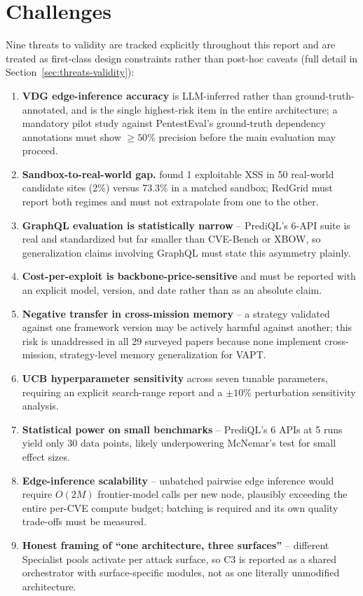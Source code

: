 \section{Challenges}
\label{sec:intro_challenges}
\label{sec:threats-validity}

Nine threats to validity are tracked explicitly throughout this report and are treated as first-class design constraints rather than post-hoc caveats (full detail in Section~\ref{sec:threats-validity}):

\begin{enumerate}
    \item \textbf{VDG edge-inference accuracy} is LLM-inferred rather than ground-truth-annotated, and is the single highest-risk item in the entire architecture; a mandatory pilot study against PentestEval's ground-truth dependency annotations must show $\geq 50\%$ precision before the main evaluation may proceed.
    \item \textbf{Sandbox-to-real-world gap.} \citet{fang2024hackwebsites} found 1 exploitable XSS in 50 real-world candidate sites (2\%) versus 73.3\% in a matched sandbox; RedGrid must report both regimes and must not extrapolate from one to the other.
    \item \textbf{GraphQL evaluation is statistically narrow} -- PrediQL's 6-API suite is real and standardized but far smaller than CVE-Bench or XBOW, so generalization claims involving GraphQL must state this asymmetry plainly.
    \item \textbf{Cost-per-exploit is backbone-price-sensitive} and must be reported with an explicit model, version, and date rather than as an absolute claim.
    \item \textbf{Negative transfer in cross-mission memory} -- a strategy validated against one framework version may be actively harmful against another; this risk is unaddressed in all 29 surveyed papers because none implement cross-mission, strategy-level memory generalization for VAPT.
    \item \textbf{UCB hyperparameter sensitivity} across seven tunable parameters, requiring an explicit search-range report and a $\pm 10\%$ perturbation sensitivity analysis.
    \item \textbf{Statistical power on small benchmarks} -- PrediQL's 6 APIs at 5 runs yield only 30 data points, likely underpowering McNemar's test for small effect sizes.
    \item \textbf{Edge-inference scalability} -- unbatched pairwise edge inference would require $O(2M)$ frontier-model calls per new node, plausibly exceeding the entire per-CVE compute budget; batching is required and its own quality trade-offs must be measured.
    \item \textbf{Honest framing of ``one architecture, three surfaces''} -- different Specialist pools activate per attack surface, so C3 is reported as a shared orchestrator with surface-specific modules, not as one literally unmodified architecture.
\end{enumerate}
